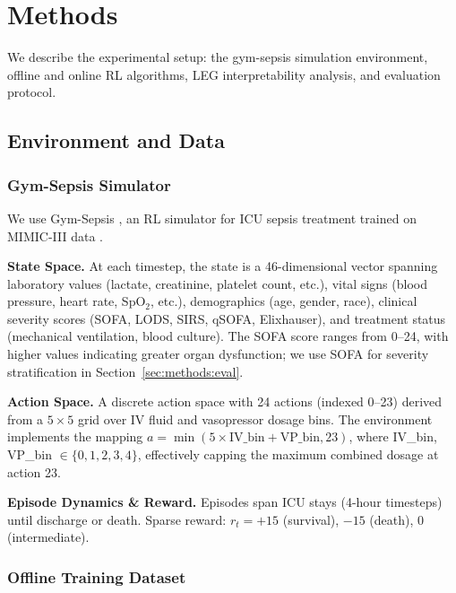 
\section{Methods}\label{sec:methods}

We describe the experimental setup: the gym-sepsis simulation environment, offline and online RL algorithms, LEG interpretability analysis, and evaluation protocol.

\subsection{Environment and Data}\label{sec:methods:env}

\subsubsection{Gym-Sepsis Simulator}

We use Gym-Sepsis \citep{raghu2017sepsis_drl}, an RL simulator for ICU sepsis treatment trained on MIMIC-III data \citep{johnson2016mimic3}.

\textbf{State Space.} At each timestep, the state is a 46-dimensional vector spanning laboratory values (lactate, creatinine, platelet count, etc.), vital signs (blood pressure, heart rate, SpO$_2$, etc.), demographics (age, gender, race), clinical severity scores (SOFA, LODS, SIRS, qSOFA, Elixhauser), and treatment status (mechanical ventilation, blood culture). The SOFA score \citep{vincent1996sofa} ranges from 0--24, with higher values indicating greater organ dysfunction; we use SOFA for severity stratification in Section~\ref{sec:methods:eval}.

\textbf{Action Space.} A discrete action space with 24 actions (indexed 0--23) derived from a $5 \times 5$ grid over IV fluid and vasopressor dosage bins. The environment implements the mapping $a = \min(5 \times \text{IV\_bin} + \text{VP\_bin}, 23)$, where IV\_bin, VP\_bin $\in \{0, 1, 2, 3, 4\}$, effectively capping the maximum combined dosage at action 23.

\textbf{Episode Dynamics \& Reward.} Episodes span ICU stays (4-hour timesteps) until discharge or death. Sparse reward: $r_t = +15$ (survival), $-15$ (death), $0$ (intermediate).

\subsubsection{Offline Training Dataset}


